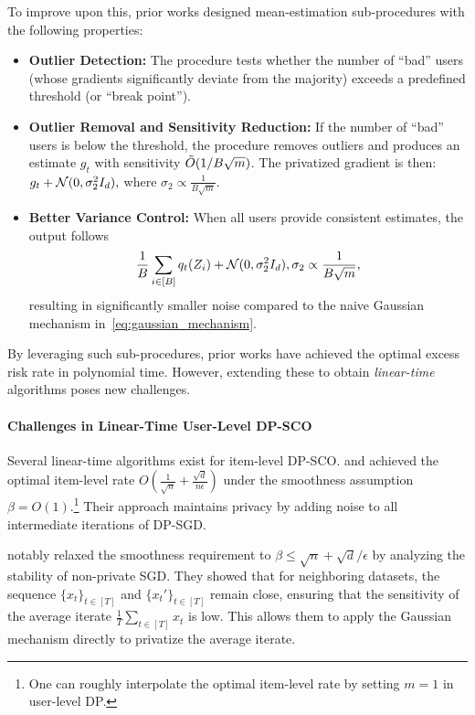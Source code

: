 To improve upon this, prior works \citep{asi2023user, LLA24} designed mean-estimation sub-procedures with the following properties:
\begin{itemize}[topsep=3pt,itemsep=-3pt]
    \item \textbf{Outlier Detection:} The procedure tests whether the number of ``bad'' users (whose gradients significantly deviate from the majority) exceeds a predefined threshold (or ``break point'').
    \item \textbf{Outlier Removal and Sensitivity Reduction:} If the number of ``bad'' users is below the threshold, the procedure removes outliers and produces an estimate $g_t$ with sensitivity $\Tilde{O}(1/B\sqrt{m})$. The privatized gradient is then:
    $
    g_t + \mathcal{N}(0, \sigma_2^2 I_d),
    $
    where $\sigma_2 \propto \frac{1}{B\sqrt{m}}$.
    \item \textbf{Better Variance Control:} When all users provide consistent estimates, the output follows 
    \begin{align*}
        \frac{1}{B}\sum_{i\in[B]}q_t(Z_i)+\mathcal{N}(0,\sigma_2^2I_d), \sigma_2\propto \frac{1}{B\sqrt{m}},
    \end{align*}
    resulting in significantly smaller noise compared to the naive Gaussian mechanism in~\eqref{eq:gaussian_mechanism}.
\end{itemize}

By leveraging such sub-procedures, prior works have achieved the optimal excess risk rate in polynomial time. However, extending these to obtain \textit{linear-time} algorithms poses new challenges.

\paragraph{Challenges in Linear-Time User-Level DP-SCO}

Several linear-time algorithms exist for item-level DP-SCO. \cite{zhang2022differentially} and \cite{choquetteoptimal} achieved the optimal item-level rate $O\left(\frac{1}{\sqrt{n}} + \frac{\sqrt{d}}{n\epsilon}\right)$ under the smoothness assumption $\beta = O(1)$.\footnote{One can roughly interpolate the optimal item-level rate by setting $m=1$ in user-level DP.} Their approach maintains privacy by adding noise to all intermediate iterations of DP-SGD.

\cite{FKT20} notably relaxed the smoothness requirement to $\beta \leq \sqrt{n} + \sqrt{d}/\epsilon$ by analyzing the stability of non-private SGD. They showed that for neighboring datasets, the sequence $\{x_t\}_{t \in [T]}$ and $\{x_t'\}_{t \in [T]}$ remain close, ensuring that the sensitivity of the average iterate $\frac{1}{T} \sum_{t \in [T]} x_t$ is low. This allows them to apply the Gaussian mechanism directly to privatize the average iterate.


